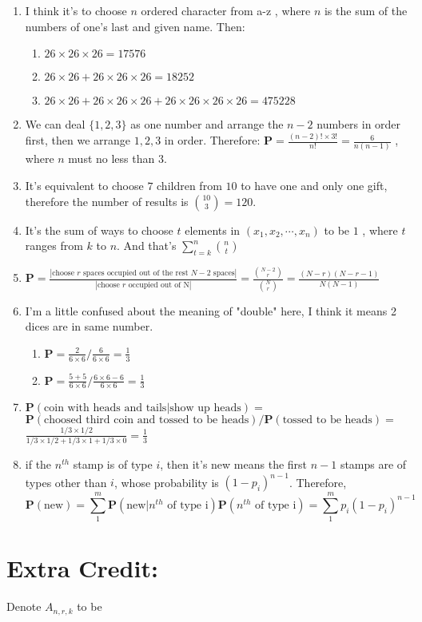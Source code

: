 \documentclass[12pt]{article}
\begin{document}
\begin{enumerate}
\begin{enumerate}
    \end{enumerate}
    \item I think it's to choose $n$ ordered character from a-z , where $n$ is the sum of the numbers of one's last and given name. Then:
    \begin{enumerate}
        \item $26 \times 26 \times 26 = 17576$
        \item $26 \times 26 + 26 \times 26 \times 26 = 18252$
        \item $26 \times 26 + 26 \times 26 \times 26 + 26 \times 26 \times 26 \times 26 = 475228$
    \end{enumerate}
    \item 
    We can deal $\{1,2,3\}$ as one number and arrange the $n-2$ numbers in order first, then we arrange ${1,2,3}$ in order. Therefore:
    $\textbf{P} = \frac{ ( n - 2 ) ! \times 3 ! }{ n ! } = \frac{6}{n ( n - 1 )}$ , where $n$ must no less than $3$. 
    \item 
    It's equivalent to choose $7$ children from $10$ to have one and only one gift, therefore the number of results is $\binom{10}{3} = 120$.
    \item 
    It's the sum of ways to choose $t$ elements in $(x_1,x_2,\cdots,x_n)$ to be $1$ , where $t$ ranges from $k$ to $n$. And that's $\sum_{t=k}^{n} \binom{n}{t}$
    \item 
    $\textbf{P} = \frac{|\text{choose $r$ spaces occupied out of the rest $N-2$ spaces}|}{|\text{choose $r$ occupied out of N}|} = \frac{\binom{N - 2}{r}}{\binom{N}{r}} = \frac{(N - r) (N - r - 1)}{N (N - 1)}$
    \item I'm a little confused about the meaning of "double" here, I think it means 2 dices are in same number.
    \begin{enumerate}
        \item $\textbf{P} = \frac{2}{6 \times 6} / \frac{6}{6 \times 6} = \frac{1}{3}$
        \item $\textbf{P} = \frac{5 + 5}{6 \times 6} / \frac{6 \times 6 - 6}{6 \times 6} = \frac{1}{3}$
    \end{enumerate}
    \item 
    $\textbf{P}(\text{coin with heads and tails} | \text{show up heads}) = $\\
    $\textbf{P}(\text{choosed third coin and tossed to be heads}) / \textbf{P}(\text{tossed to be heads}) = $\\
    $\frac{1/3 \times 1/2}{1/3 \times 1/2 + 1/3 \times 1 + 1/3 \times 0} = \frac{1}{3}$
    \item 
    if the $n^{th}$ stamp is of type $i$, then it's new means the first $n - 1$ stamps are of types other than $i$, whose probability is $(1 - p_i)^{n-1}$. Therefore, 
    $$\textbf{P}(\text{new}) = \sum_1^m \textbf{P}(\text{new} | \text{$n^{th}$ of type i}) \textbf{P}(\text{$n^{th}$ of type i}) = \sum_1^m p_i (1-p_i)^{n-1}$$
\end{enumerate}

\section*{\normalsize{Extra Credit:}}

Denote $A_{n,r,k}$ to be
\end{document}
